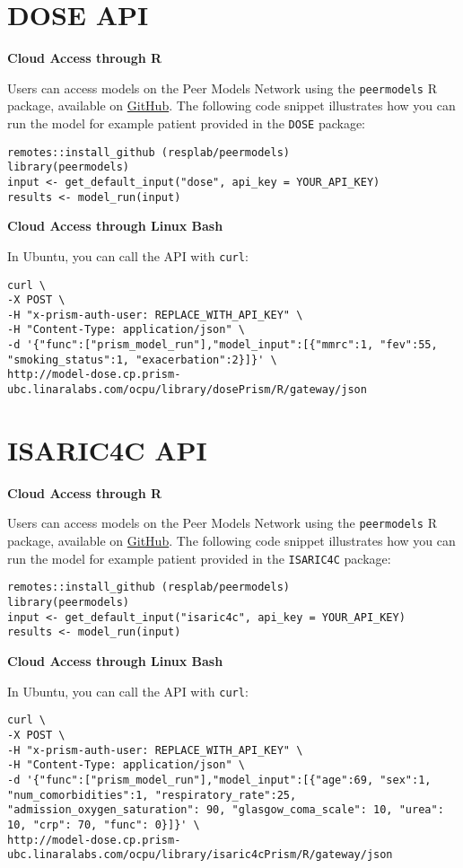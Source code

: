 \documentclass[
]{book}
\begin{document}
\hypertarget{dose-api}{%
\section{DOSE API}\label{dose-api}}

\textbf{Cloud Access through R}

Users can access models on the Peer Models Network using the \texttt{peermodels} R package, available on \href{https://github.com/resplab/peermodels}{GitHub}. The following code snippet illustrates how you can run the model for example patient provided in the \texttt{DOSE} package:

\begin{verbatim}
remotes::install_github (resplab/peermodels)
library(peermodels)
input <- get_default_input("dose", api_key = YOUR_API_KEY)
results <- model_run(input)
\end{verbatim}

\textbf{Cloud Access through Linux Bash}

In Ubuntu, you can call the API with \texttt{curl}:

\begin{verbatim}
curl \
-X POST \
-H "x-prism-auth-user: REPLACE_WITH_API_KEY" \
-H "Content-Type: application/json" \
-d '{"func":["prism_model_run"],"model_input":[{"mmrc":1, "fev":55, "smoking_status":1, "exacerbation":2}]}' \
http://model-dose.cp.prism-ubc.linaralabs.com/ocpu/library/dosePrism/R/gateway/json
\end{verbatim}

\hypertarget{isaric4c-api}{%
\section{ISARIC4C API}\label{isaric4c-api}}

\textbf{Cloud Access through R}

Users can access models on the Peer Models Network using the \texttt{peermodels} R package, available on \href{https://github.com/resplab/peermodels}{GitHub}. The following code snippet illustrates how you can run the model for example patient provided in the \texttt{ISARIC4C} package:

\begin{verbatim}
remotes::install_github (resplab/peermodels)
library(peermodels)
input <- get_default_input("isaric4c", api_key = YOUR_API_KEY)
results <- model_run(input)
\end{verbatim}

\textbf{Cloud Access through Linux Bash}

In Ubuntu, you can call the API with \texttt{curl}:

\begin{verbatim}
curl \
-X POST \
-H "x-prism-auth-user: REPLACE_WITH_API_KEY" \
-H "Content-Type: application/json" \
-d '{"func":["prism_model_run"],"model_input":[{"age":69, "sex":1, "num_comorbidities":1, "respiratory_rate":25, "admission_oxygen_saturation": 90, "glasgow_coma_scale": 10, "urea": 10, "crp": 70, "func": 0}]}' \
http://model-dose.cp.prism-ubc.linaralabs.com/ocpu/library/isaric4cPrism/R/gateway/json
\end{verbatim}
\end{document}
